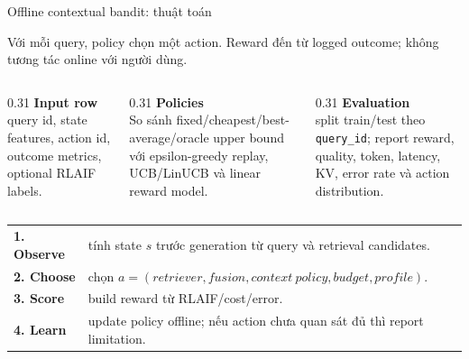 \documentclass[aspectratio=169,10pt]{beamer}
\newcommand{\code}[1]{\texttt{\footnotesize #1}}
\newcommand{\minihead}[1]{{\bfseries\color{AccentDark}#1}}
\begin{document}
\begin{frame}{Offline contextual bandit: thuật toán}
  \small
  \begin{center}
    \normalsize
    Với mỗi query, policy chọn một action. Reward đến từ logged outcome; không tương tác online với người dùng.
  \end{center}

  \vspace{0.28cm}
  \begin{columns}[T,onlytextwidth]
    \begin{column}{0.31\textwidth}
      \minihead{Input row}\\
      \color{Muted}query id, state features, action id, outcome metrics, optional RLAIF labels.
    \end{column}
    \begin{column}{0.31\textwidth}
      \minihead{Policies}\\
      \color{Muted}So sánh fixed/cheapest/best-average/oracle upper bound với epsilon-greedy replay, UCB/LinUCB và linear reward model.
    \end{column}
    \begin{column}{0.31\textwidth}
      \minihead{Evaluation}\\
      \color{Muted}split train/test theo \code{query\_id}; report reward, quality, token, latency, KV, error rate và action distribution.
    \end{column}
  \end{columns}

  \vspace{0.34cm}
  \footnotesize
  \begin{tabular}{>{\bfseries}p{}p{}}
    1. Observe & tính state \(s\) trước generation từ query và retrieval candidates. \\
    2. Choose & chọn \(a=(retriever, fusion, context\ policy, budget, profile)\). \\
    3. Score & build reward từ RLAIF/cost/error. \\
    4. Learn & update policy offline; nếu action chưa quan sát đủ thì report limitation. \\
  \end{tabular}
\end{frame}
\end{document}
